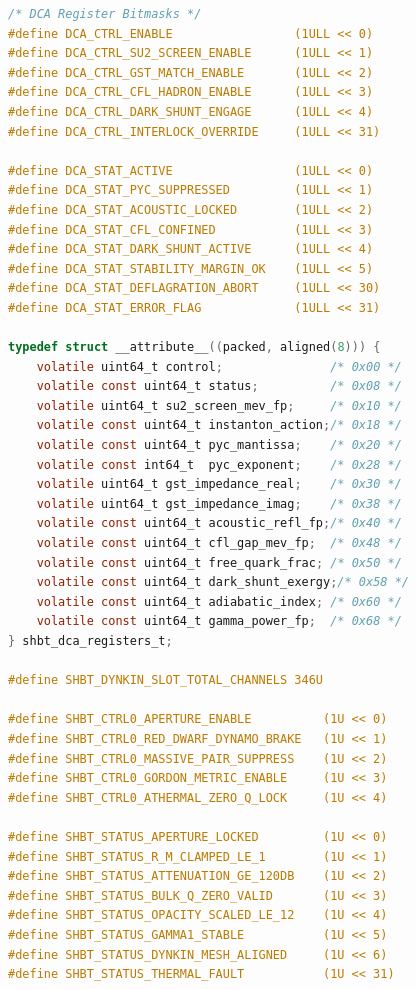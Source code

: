 \documentclass[11pt,onecolumn]{article}
\begin{document}
\begin{lstlisting}[language=C,caption={The normative freestanding C11 hardware MMIO and hyper-frame header (\texttt{include/shbt\_swarm\_mmio.h} v14.0).},label={lst:shbt_swarm_mmio}]
/* DCA Register Bitmasks */
#define DCA_CTRL_ENABLE                 (1ULL << 0)
#define DCA_CTRL_SU2_SCREEN_ENABLE      (1ULL << 1)
#define DCA_CTRL_GST_MATCH_ENABLE       (1ULL << 2)
#define DCA_CTRL_CFL_HADRON_ENABLE      (1ULL << 3)
#define DCA_CTRL_DARK_SHUNT_ENGAGE      (1ULL << 4)
#define DCA_CTRL_INTERLOCK_OVERRIDE     (1ULL << 31)

#define DCA_STAT_ACTIVE                 (1ULL << 0)
#define DCA_STAT_PYC_SUPPRESSED         (1ULL << 1)
#define DCA_STAT_ACOUSTIC_LOCKED        (1ULL << 2)
#define DCA_STAT_CFL_CONFINED           (1ULL << 3)
#define DCA_STAT_DARK_SHUNT_ACTIVE      (1ULL << 4)
#define DCA_STAT_STABILITY_MARGIN_OK    (1ULL << 5)
#define DCA_STAT_DEFLAGRATION_ABORT     (1ULL << 30)
#define DCA_STAT_ERROR_FLAG             (1ULL << 31)

typedef struct __attribute__((packed, aligned(8))) {
    volatile uint64_t control;               /* 0x00 */
    volatile const uint64_t status;          /* 0x08 */
    volatile uint64_t su2_screen_mev_fp;     /* 0x10 */
    volatile const uint64_t instanton_action;/* 0x18 */
    volatile const uint64_t pyc_mantissa;    /* 0x20 */
    volatile const int64_t  pyc_exponent;    /* 0x28 */
    volatile uint64_t gst_impedance_real;    /* 0x30 */
    volatile uint64_t gst_impedance_imag;    /* 0x38 */
    volatile const uint64_t acoustic_refl_fp;/* 0x40 */
    volatile const uint64_t cfl_gap_mev_fp;  /* 0x48 */
    volatile const uint64_t free_quark_frac; /* 0x50 */
    volatile const uint64_t dark_shunt_exergy;/* 0x58 */
    volatile const uint64_t adiabatic_index; /* 0x60 */
    volatile const uint64_t gamma_power_fp;  /* 0x68 */
} shbt_dca_registers_t;

#define SHBT_DYNKIN_SLOT_TOTAL_CHANNELS 346U

#define SHBT_CTRL0_APERTURE_ENABLE          (1U << 0)
#define SHBT_CTRL0_RED_DWARF_DYNAMO_BRAKE   (1U << 1)
#define SHBT_CTRL0_MASSIVE_PAIR_SUPPRESS    (1U << 2)
#define SHBT_CTRL0_GORDON_METRIC_ENABLE     (1U << 3)
#define SHBT_CTRL0_ATHERMAL_ZERO_Q_LOCK     (1U << 4)

#define SHBT_STATUS_APERTURE_LOCKED         (1U << 0)
#define SHBT_STATUS_R_M_CLAMPED_LE_1        (1U << 1)
#define SHBT_STATUS_ATTENUATION_GE_120DB    (1U << 2)
#define SHBT_STATUS_BULK_Q_ZERO_VALID       (1U << 3)
#define SHBT_STATUS_OPACITY_SCALED_LE_12    (1U << 4)
#define SHBT_STATUS_GAMMA1_STABLE           (1U << 5)
#define SHBT_STATUS_DYNKIN_MESH_ALIGNED     (1U << 6)
#define SHBT_STATUS_THERMAL_FAULT           (1U << 31)


\end{lstlisting}
\end{document}
